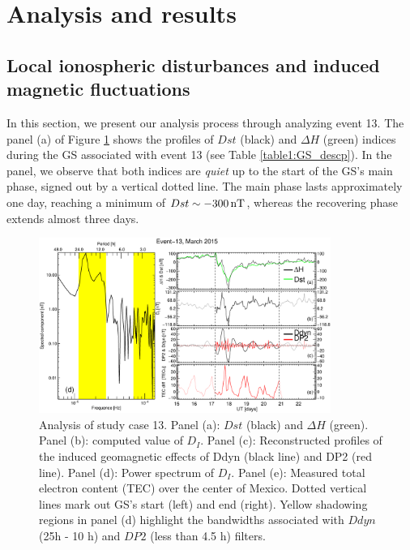 \documentclass[a4paper,fleqn]{cas-dc}
\begin{document}
\section{Analysis and results}
\label{results}

\subsection{Local ionospheric disturbances and induced magnetic fluctuations}
\label{analysis}
In this section, we present our analysis process through analyzing event 13. The panel (a) of Figure \ref{fig:iono_resp} shows the profiles of $Dst$ (black) and $\Delta H$ (green) indices during the GS associated with event 13 (see Table \ref{table1:GS_descp}). In the panel, we observe that both indices are \emph{quiet} up to the start of the GS's main phase, signed out by a vertical dotted line. The main phase lasts approximately one day, reaching a minimum of $Dst \sim -300\,{\rm nT}$, whereas the recovering phase extends almost three days. 

\begin{figure}
\centering
    \includegraphics[width=0.85\textwidth]{images/diono/iono_PI_2015-03-15.eps}
    \caption{Analysis of study case 13. Panel (a): $Dst$ (black) and $\Delta H$ (green). Panel (b): computed value of $D_I$. Panel (c): Reconstructed profiles of the induced geomagnetic effects of Ddyn (black line) and DP2 (red line). Panel (d): Power spectrum of $D_I$. Panel (e): Measured total electron content (TEC) over the center of Mexico. Dotted vertical lines mark out GS's start (left) and end (right). Yellow shadowing regions in panel (d) highlight the bandwidths associated with $Ddyn$ (25h - 10 h) and $DP2$ (less than 4.5 h) filters.}
    \label{fig:iono_resp}
\end{figure}
\end{document}
